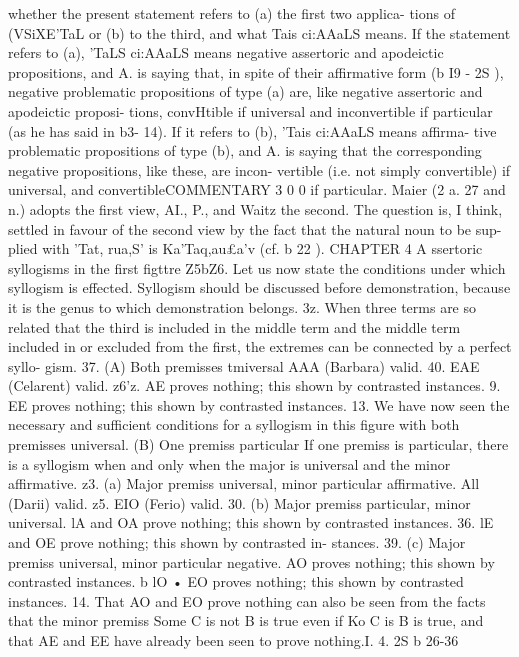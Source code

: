 {{{{whether the present statement refers to (a) the first two applica-
tions of (VSiXE'TaL or (b) to the third, and what Tais ci:AAaLS means.
If the statement refers to (a), 'TaLS ci:AAaLS means negative assertoric
and apodeictic propositions, and A. is saying that, in spite of
their affirmative form (b I9 - 2S ), negative problematic propositions
of type (a) are, like negative assertoric and apodeictic proposi-
tions, convHtible if universal and inconvertible if particular (as
he has said in b3- 14). If it refers to (b), 'Tais ci:AAaLS means affirma-
tive problematic propositions of type (b), and A. is saying that
the corresponding negative propositions, like these, are incon-
vertible (i.e. not simply convertible) if universal, and convertibleCOMMENTARY
3 0 0
if particular. Maier (2 a. 27 and n.) adopts the first view, AI., P.,
and Waitz the second. The question is, I think, settled in favour
of the second view by the fact that the natural noun to be sup-
plied with 'Tat, rua,S' is Ka'Taq,au£a'v (cf. b 22 ).
CHAPTER 4
A ssertoric syllogisms in the first figttre
Z5bZ6. Let us now state the conditions under which syllogism
is effected. Syllogism should be discussed before demonstration,
because it is the genus to which demonstration belongs.
3z. When three terms are so related that the third is included
in the middle term and the middle term included in or excluded
from the first, the extremes can be connected by a perfect syllo-
gism.
37.
(A) Both premisses tmiversal
AAA (Barbara) valid.
40. EAE (Celarent) valid.
z6'z. AE proves nothing; this shown by contrasted instances.
9. EE proves nothing; this shown by contrasted instances.
13. We have now seen the necessary and sufficient conditions
for a syllogism in this figure with both premisses universal.
(B) One premiss particular
If one premiss is particular, there is a syllogism when and only
when the major is universal and the minor affirmative.
z3. (a) Major premiss universal, minor particular affirmative.
All (Darii) valid.
z5. EIO (Ferio) valid.
30. (b) Major premiss particular, minor universal. lA and OA
prove nothing; this shown by contrasted instances.
36. lE and OE prove nothing; this shown by contrasted in-
stances.
39. (c) Major premiss universal, minor particular negative.
AO proves nothing; this shown by contrasted instances.
b lO • EO proves nothing; this shown by contrasted instances.
14. That AO and EO prove nothing can also be seen from the
facts that the minor premiss Some C is not B is true even if Ko C
is B is true, and that AE and EE have already been seen to
prove nothing.I. 4. 2S b 26-36
}}}}
